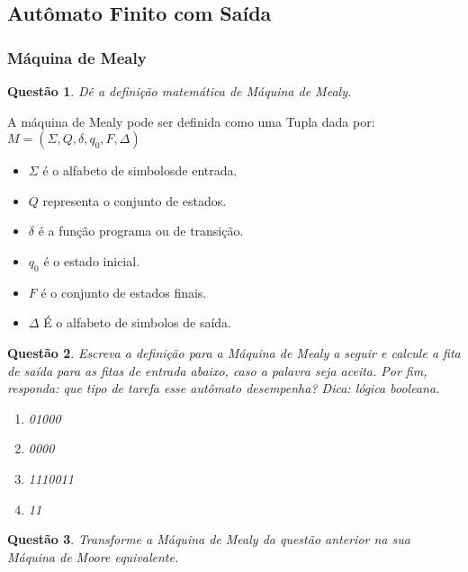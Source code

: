 \documentclass{article}
\newtheorem{problem}{Questão}
\begin{document}
    \subsection{Autômato Finito com Saída}
    
        \subsubsection{Máquina de Mealy}
            \begin{problem}
                    Dê a definição matemática de Máquina de Mealy.
            \end{problem}
    \begin{solution}
            
      A máquina de Mealy pode ser definida como uma Tupla dada por:
        $M = (\Sigma, Q, \delta, q_0, F, \Delta)$
        
        \begin{itemize}
        \item $\Sigma$ é o alfabeto de simbolosde entrada.
        \item $Q$ representa o conjunto de estados.
        \item $\delta$ é a função programa ou de transição.
        \item $q_0$ é o estado inicial.
        \item $F$ é o conjunto de estados finais.
        \item $\Delta$ É o alfabeto de simbolos de saída.
        \end{itemize}
            
        
    \end{solution}
            \begin{problem}
                    Escreva a definição para a Máquina de Mealy a seguir e calcule a fita de saída para as fitas de entrada abaixo, caso a palavra seja aceita. Por fim, responda: que tipo de tarefa esse autômato desempenha? Dica: lógica booleana.
                    
                    \begin{enumerate}[label=(\alph*)]
                        \item 01000
                        \item 0000
                        \item 1110011
                        \item 11
                    \end{enumerate}
            
            \end{problem}
            \begin{solution}
        
    \end{solution}
            \begin{problem}
                  Transforme a Máquina de Mealy da questão anterior na sua Máquina de Moore equivalente.
            \end{problem}
            \begin{solution}
        
    \end{solution}
\end{document}
